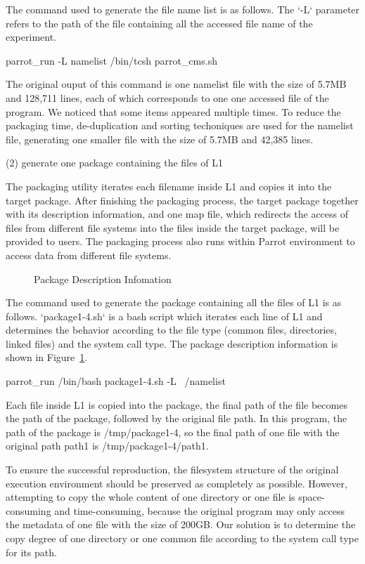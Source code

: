 \documentclass{acm_proc_article-sp}
\begin{document}
The command used to generate the file name list is as follows. The `-L` parameter refers to the path of the file containing all the accessed file name of the experiment.

parrot\_run -L namelist /bin/tcsh parrot\_cms.sh

The original ouput of this command is one namelist file with the size of 5.7MB
and 128,711 lines, each of which corresponds to one one accessed file of the
program. We noticed that some items appeared multiple times. To reduce the
packaging time, de-duplication and sorting techoniques are used for the
namelist file, generating one smaller file with the size of 5.7MB and 42,385
lines.

(2) generate one package containing the files of L1 

The packaging utility iterates each filename inside L1 and copies it into the
target package. After finishing the packaging process, the target package
together with its description information, and one map file, which redirects
the access of files from different file systems into the files inside the target package, will be
provided to users. The packaging process also runs within Parrot environment to
access data from different file systems.

\begin{figure}
\centering
{}
\caption{Package Description Infomation}
\label{fig:package-info}
\end{figure}
The command used to generate the package containing all the files of L1 is as follows. 
`package1-4.sh` is a bash script which iterates each line of L1 and
determines the behavior according to the file type (common files, directories,
linked files) and the system call type.
The package description information is shown in Figure~\ref{fig:package-info}.

parrot\_run /bin/bash package1-4.sh -L ~/namelist

Each file inside L1 is copied into the package, the final path of the file becomes the path of the package, followed by the original file path. In this program, the path of the package is /tmp/package1-4, so the final path of one file with the original path path1 is /tmp/package1-4/path1.

To ensure the successful reproduction, the filesystem structure of the original
execution environment should be preserved as completely as possible. However,
attempting to copy the whole content of one directory or one file is
space-consuming and time-consuming, because the original program may only
access the metadata of one file with the size of 200GB. Our solution is to
determine the copy degree of one directory or one common file according to the
system call type for its path.
\end{document}
